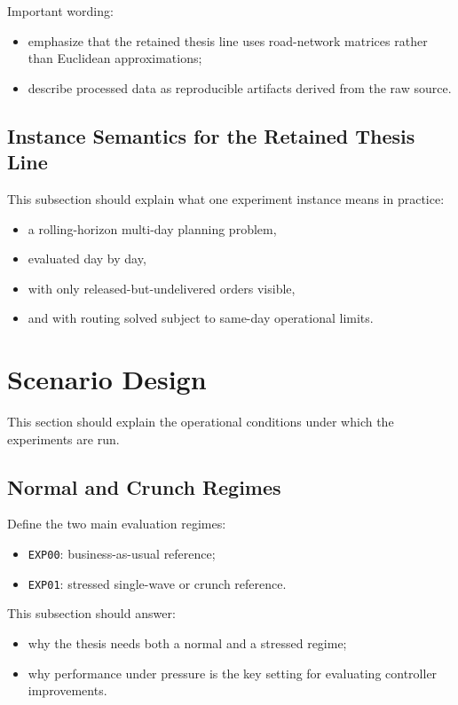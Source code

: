 \noindent Important wording:
\begin{itemize}
    \item emphasize that the retained thesis line uses road-network matrices rather than Euclidean approximations;
    \item describe processed data as reproducible artifacts derived from the raw source.
\end{itemize}

\subsection{Instance Semantics for the Retained Thesis Line}

This subsection should explain what one experiment instance means in practice:
\begin{itemize}
    \item a rolling-horizon multi-day planning problem,
    \item evaluated day by day,
    \item with only released-but-undelivered orders visible,
    \item and with routing solved subject to same-day operational limits.
\end{itemize}

\section{Scenario Design}

This section should explain the operational conditions under which the experiments are run.

\subsection{Normal and Crunch Regimes}

Define the two main evaluation regimes:
\begin{itemize}
    \item \texttt{EXP00}: business-as-usual reference;
    \item \texttt{EXP01}: stressed single-wave or crunch reference.
\end{itemize}

This subsection should answer:
\begin{itemize}
    \item why the thesis needs both a normal and a stressed regime;
    \item why performance under pressure is the key setting for evaluating controller improvements.
\end{itemize}

